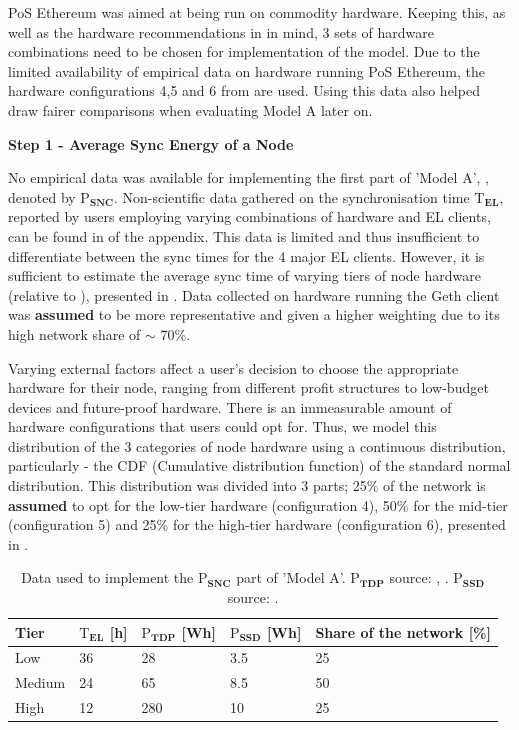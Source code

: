 PoS Ethereum was aimed at being run on commodity hardware. Keeping this, as well as the hardware recommendations in  in mind, 3 sets of hardware combinations need to be chosen for implementation of the model. Due to the limited availability of empirical data on hardware running PoS Ethereum, the hardware configurations 4,5 and 6 from  are used. Using this data also helped draw fairer comparisons when evaluating Model A later on. 

\textbf{Step 1 - Average Sync Energy of a Node}

No empirical data was available for implementing the first part of 'Model A', , denoted by $\boldsymbol{\mathrm{P}_{SNC}}$. Non-scientific data gathered on the synchronisation time $\boldsymbol{\mathrm{T}_{EL}}$, reported by users employing varying combinations of hardware and EL clients, can be found in  of the appendix. This data is limited and thus insufficient to differentiate between the sync times for the 4 major EL clients. However, it is sufficient to estimate the average sync time of varying tiers of node hardware (relative to ), presented in . Data collected on hardware running the Geth client was \textbf{assumed} to be more representative and given a higher weighting due to its high network share of $\sim$ 70\%. 

Varying external factors affect a user's decision to choose the appropriate hardware for their node, ranging from different profit structures to low-budget devices and future-proof hardware. There is an immeasurable amount of hardware configurations that users could opt for. Thus, we model this distribution of the 3 categories of node hardware using a continuous distribution, particularly - the CDF (Cumulative distribution function) of the standard normal distribution. This distribution was divided into 3 parts; 25\% of the network is \textbf{assumed} to opt for the low-tier hardware (configuration 4), 50\% for the mid-tier (configuration 5) and 25\% for the high-tier hardware (configuration 6), presented in . 

\begin{table}[h]
\centering
\begin{tabular}{|l|l|l|l|l|}
\hline
\textbf{Tier} & \textbf{$\boldsymbol{\mathrm{T}_{EL}}$ {[}h{]}} & \textbf{$\boldsymbol{\mathrm{P}_{TDP}}$ {[}Wh{]}} & \textbf{$\boldsymbol{\mathrm{P}_{SSD}}$ {[}Wh{]}} & \textbf{Share of the network {[}\%{]}} \\ \hline
Low    & 36 & 28  & 3.5 & 25 \\ \hline
Medium & 24 & 65  & 8.5 & 50 \\ \hline
High   & 12 & 280 & 10  & 25 \\ \hline
\end{tabular}
\caption{Data used to implement the  $\boldsymbol{\mathrm{P}_{SNC}}$ part of 'Model A'.  $\boldsymbol{\mathrm{P}_{TDP}}$ source: \cite{IntelFAQs}, \cite{AMDDatabase}. $\boldsymbol{\mathrm{P}_{SSD}}$ source: \cite{RachanaKhamamkar2020AnalyzingDrives}.}
\label{Table:SyncEnergy}
\end{table} 


